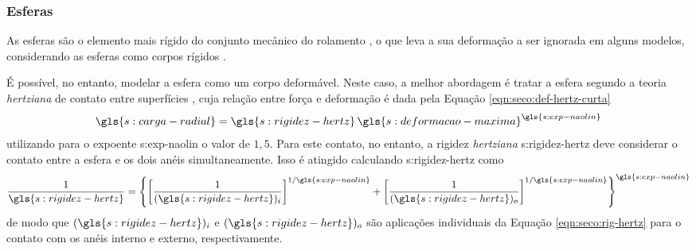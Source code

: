 \documentclass[12pt,oneside,english,brazil,lmodern,siglas,simbolos,cite=num]{ucsmonograph}
\begin{document}
	\subsubsection{Esferas}
	As esferas são o elemento mais rígido do conjunto mecânico do rolamento \cite{sassi:2007}, o que leva a sua deformação a ser ignorada em alguns modelos, considerando as esferas como corpos rígidos \cite{mcfadden:1984,tandon:1997,sassi:2007,cong:2013}.
	
	É possível, no entanto, modelar a esfera como um corpo deformável.
	Neste caso, a melhor abordagem é tratar a esfera segundo a teoria \emph{hertziana} de contato entre superfícies \cite{patil:2010}, cuja relação entre força e deformação é dada pela Equação \ref{eqn:seco:def-hertz-curta}
	\begin{equation*}
		\gls{s:carga-radial} = \gls{s:rigidez-hertz}\,
		\gls{s:deformacao-maxima}^{\gls{s:exp-naolin}}
	\end{equation*}
	utilizando para o expoente \gls{s:exp-naolin} o valor de $1,5$.
	Para este contato, no entanto, a rigidez \emph{hertziana} \gls{s:rigidez-hertz} deve considerar o contato entre a esfera e os dois anéis simultaneamente.
	Isso é atingido calculando \gls{s:rigidez-hertz} como \cite{patil:2010,hamrock:1991}
	\begin{equation}
		\frac{1}{\gls{s:rigidez-hertz}} = \left\lbrace \left[
		\frac{1}{(\gls{s:rigidez-hertz})_i} \right]^{1/\gls{s:exp-naolin}}
		+ \left[
		\frac{1}{(\gls{s:rigidez-hertz})_o} \right]^{1/\gls{s:exp-naolin}}
		\right\rbrace^{\gls{s:exp-naolin}}
	\end{equation}
	de modo que $ (\gls{s:rigidez-hertz})_i $ e $ (\gls{s:rigidez-hertz})_o $ são aplicações individuais da Equação \ref{eqn:seco:rig-hertz} para o contato com os anéis interno e externo, respectivamente.
	
\end{document}

